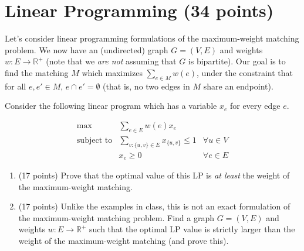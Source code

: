 \documentclass[11pt]{article}
\begin{document}
\section{Linear Programming (34 points)}

Let's consider linear programming formulations of the maximum-weight matching problem.  We now have an (undirected) graph $G = (V, E)$ and weights $w : E \rightarrow \mathbb{R}^+$ (note that we \emph{are not} assuming that $G$ is bipartite).  Our goal is to find the matching $M$ which maximizes $\sum_{e \in M} w(e)$, under the constraint that for all $e, e' \in M$, $e \cap e' = \emptyset$ (that is, no two edges in $M$ share an endpoint).  

Consider the following linear program which has a variable $x_e$ for every edge $e$.  

\begin{align*}
\max &\sum_{e \in E} w(e) x_e \\
\text{subject to} & \sum_{v : \{u,v\} \in E} x_{\{u,v\}} \leq 1  & \forall u \in V \\
& x_e \geq 0 & \forall e \in E
\end{align*}


\begin{enumerate}
\item (17 points) Prove that the optimal value of this LP is \emph{at least} the weight of the maximum-weight matching.




\item (17 points) Unlike the examples in class, this is not an exact formulation of the maximum-weight matching problem.  Find a graph $G = (V,E)$ and weights $w : E \rightarrow \mathbb{R}^+$ such that the optimal LP value is strictly larger than the weight of the maximum-weight matching (and prove this).  




\end{enumerate}
\end{document}
